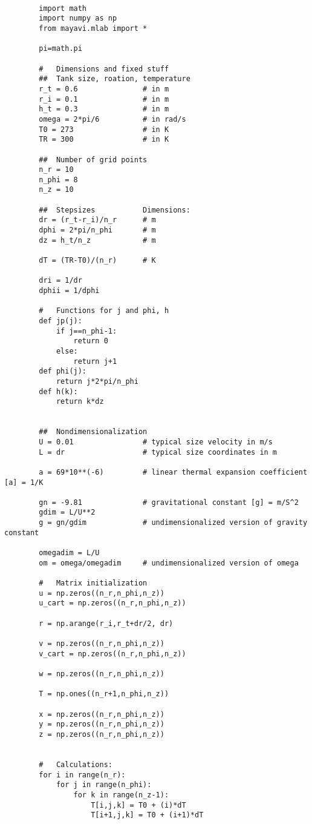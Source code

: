 \documentclass[12pt, a4paper]{article} %
\begin{document}
		\begin{lstlisting}
		
		import math
		import numpy as np
		from mayavi.mlab import *
		
		pi=math.pi
		
		#   Dimensions and fixed stuff
		##  Tank size, roation, temperature
		r_t = 0.6               # in m
		r_i = 0.1               # in m
		h_t = 0.3               # in m
		omega = 2*pi/6          # in rad/s
		T0 = 273                # in K
		TR = 300				# in K
		
		##  Number of grid points
		n_r = 10
		n_phi = 8
		n_z = 10
		
		##  Stepsizes           Dimensions:
		dr = (r_t-r_i)/n_r      # m
		dphi = 2*pi/n_phi       # m
		dz = h_t/n_z            # m
		
		dT = (TR-T0)/(n_r)    	# K
		
		dri = 1/dr
		dphii = 1/dphi
		
		#   Functions for j and phi, h
		def jp(j):
		    if j==n_phi-1:
		        return 0
		    else:
		        return j+1
		def phi(j):
		    return j*2*pi/n_phi
		def h(k):
		    return k*dz
		
		
		##  Nondimensionalization
		U = 0.01                # typical size velocity in m/s
		L = dr                  # typical size coordinates in m
		
		a = 69*10**(-6)         # linear thermal expansion coefficient [a] = 1/K
		
		gn = -9.81              # gravitational constant [g] = m/S^2
		gdim = L/U**2
		g = gn/gdim             # undimensionalized version of gravity constant
		
		omegadim = L/U
		om = omega/omegadim     # undimensionalized version of omega
		
		#   Matrix initialization
		u = np.zeros((n_r,n_phi,n_z))      
		u_cart = np.zeros((n_r,n_phi,n_z))
		
		r = np.arange(r_i,r_t+dr/2, dr)
		
		v = np.zeros((n_r,n_phi,n_z))
		v_cart = np.zeros((n_r,n_phi,n_z))
		
		w = np.zeros((n_r,n_phi,n_z))
		
		T = np.ones((n_r+1,n_phi,n_z))
		
		x = np.zeros((n_r,n_phi,n_z))
		y = np.zeros((n_r,n_phi,n_z))
		z = np.zeros((n_r,n_phi,n_z))
		
		
		#   Calculations:
		for i in range(n_r):
		    for j in range(n_phi):
		        for k in range(n_z-1):
		            T[i,j,k] = T0 + (i)*dT
		            T[i+1,j,k] = T0 + (i+1)*dT
		

\end{lstlisting}
\end{document}
